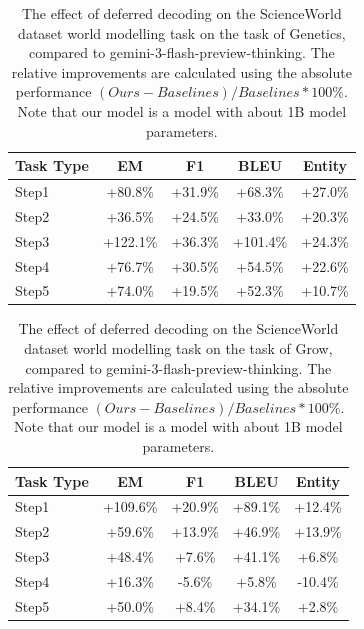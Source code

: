 \begin{table}[h]
\centering
    \setlength\tabcolsep{15pt}
    \setlength\extrarowheight{0pt}
\caption{The effect of deferred decoding on the ScienceWorld dataset \citep{wang-etal-2022-scienceworld} world modelling task on the task of Genetics, compared to gemini-3-flash-preview-thinking. The relative improvements are calculated using the absolute performance $(Ours - Baselines) / Baselines * 100\%$. Note that our model is a model with about 1B model parameters.}
\label{tab:scienceworld7}
\begin{tabular}{lcccc}
\toprule
\textbf{Task Type} & \textbf{EM} & \textbf{F1}
  & \textbf{BLEU} & \textbf{Entity}\\
\midrule
Step1 & +80.8\% & +31.9\% & +68.3\% & +27.0\% \\
Step2 & +36.5\% & +24.5\% & +33.0\% & +20.3\% \\
Step3 & +122.1\% & +36.3\% & +101.4\% & +24.3\% \\
Step4 & +76.7\% & +30.5\% & +54.5\% & +22.6\% \\
Step5 & +74.0\% & +19.5\% & +52.3\% & +10.7\% \\



\bottomrule
\end{tabular}
\end{table}


\begin{table}[h]
\centering
    \setlength\tabcolsep{15pt}
    \setlength\extrarowheight{0pt}
\caption{The effect of deferred decoding on the ScienceWorld dataset \citep{wang-etal-2022-scienceworld} world modelling task on the task of Grow, compared to gemini-3-flash-preview-thinking. The relative improvements are calculated using the absolute performance $(Ours - Baselines) / Baselines * 100\%$. Note that our model is a model with about 1B model parameters.}
\label{tab:scienceworld8}
\begin{tabular}{lcccc}
\toprule
\textbf{Task Type} & \textbf{EM} & \textbf{F1}
  & \textbf{BLEU} & \textbf{Entity}\\
\midrule
Step1 & +109.6\% & +20.9\% & +89.1\% & +12.4\% \\
Step2 & +59.6\% & +13.9\% & +46.9\% & +13.9\% \\
Step3 & +48.4\% & +7.6\% & +41.1\% & +6.8\% \\
Step4 & +16.3\% & -5.6\% & +5.8\% & -10.4\% \\
Step5 & +50.0\% & +8.4\% & +34.1\% & +2.8\% \\



\bottomrule
\end{tabular}
\end{table}



